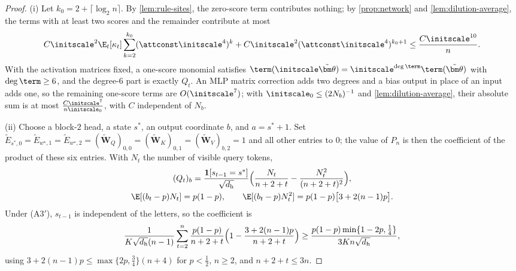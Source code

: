 \begin{proof}
(i) Let $k_0=2+\lceil\log_2n\rceil$. By \cref{lem:rule-sites}, the zero-score term contributes nothing; by \cref{prop:network} and
\cref{lem:dilution-average}, the terms with at least two scores and the remainder contribute at most
\[
 C\initscale^2\E_t[\kappa_t]\sum_{k=2}^{k_0}(\attconst\initscale^4)^k+C\initscale^2(\attconst\initscale^4)^{k_0+1}\le\frac{C\initscale^{10}}{n} .
\]
With the activation matrices fixed, a one-score monomial satisfies $\term(\initscale\tilde{\bm\theta})=\initscale^{\deg\term}\term(\tilde{\bm\theta})$ with $\deg\term\ge6$, and the
degree-$6$ part is exactly $Q_t$. An MLP matrix correction adds two degrees and a bias output in place of an input adds one, so the
remaining one-score terms are $O(\initscale^7)$; with $\initscale_0\le(2N_b)^{-1}$ and \cref{lem:dilution-average}, their absolute sum is at most
$\frac{C\initscale^7}{n\initscale_0}$, with $C$ independent of $N_b$.

(ii) Choose a block-$2$ head, a state $s^\ast$, an output coordinate $b$, and $a=s^\ast+1$. Set
$\tilde E_{s^\ast,0}=\tilde E_{w^\star,1}=\tilde E_{w^\star,2}=(\tilde{\mathbf W}_Q)_{0,0}=(\tilde{\mathbf W}_K)_{0,1}=(\tilde{\mathbf W}_V)_{b,2}=1$ and all other entries to $0$; the value of $P_n$ is then the
coefficient of the product of these six entries. With $N_t$ the number of visible query tokens,
\begin{gather*}
 (Q_t)_b=\frac{\mathbf 1[s_{t-1}=s^\ast]}{\sqrt{d_{\mathrm h}}}\Bigl(\frac{N_t}{n+2+t}-\frac{N_t^2}{(n+2+t)^2}\Bigr),\\
 \E[(b_t-p)N_t]=p(1-p),\qquad \E[(b_t-p)N_t^2]=p(1-p)\bigl[3+2(n-1)p\bigr].
\end{gather*}
Under (A3$'$), $s_{t-1}$ is independent of the letters, so the coefficient is
\[
 \frac{1}{K\sqrt{d_{\mathrm h}}(n-1)}\sum_{t=2}^n\frac{p(1-p)}{n+2+t}\Bigl(1-\frac{3+2(n-1)p}{n+2+t}\Bigr)
 \ge\frac{p(1-p)\min\{1-2p,\frac{1}{4}\}}{3Kn\sqrt{d_{\mathrm h}}},
\]
using $3+2(n-1)p\le\max\{2p,\frac{3}{4}\}(n+4)$ for $p<\frac{1}{2}$, $n\ge2$, and $n+2+t\le3n$.
\end{proof}

